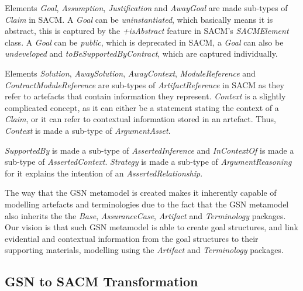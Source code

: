 Elements \textit{Goal}, \textit{Assumption}, \textit{Justification} and \textit{AwayGoal} are made sub-types of \textit{Claim} in SACM. A \textit{Goal} can be \textit{uninstantiated}, which basically means it is abstract, this is captured by the \textit{+isAbstract} feature in SACM's \textit{SACMElement} class. A \textit{Goal} can be \textit{public}, which is deprecated in SACM, a \textit{Goal} can also be \textit{undeveloped} and \textit{toBeSupportedByContract}, which are captured individually. 

Elements \textit{Solution}, \textit{AwaySolution}, \textit{AwayContext}, \textit{ModuleReference} and \textit{ContractModuleReference} are sub-types of \textit{ArtifactReference} in SACM as they refer to artefacts that contain information they represent. \textit{Context} is a slightly complicated concept, as it can either be a statement stating the context of a \textit{Claim}, or it can refer to contextual information stored in an artefact. Thus, \textit{Context} is made a sub-type of \textit{ArgumentAsset}. 

\textit{SupportedBy} is made a sub-type of \textit{AssertedInference} and \textit{InContextOf} is made a sub-type of \textit{AssertedContext}. \textit{Strategy} is made a sub-type of \textit{ArgumentReasoning} for it explains the intention of an \textit{AssertedRelationship}.

The way that the GSN metamodel is created makes it inherently capable of modelling artefacts and terminologies due to the fact that the GSN metamodel also inherits the the \textit{Base}, \textit{AssuranceCase}, \textit{Artifact} and \textit{Terminology} packages. Our vision is that such GSN metamodel is able to create goal structures, and link evidential and contextual information from the goal structures to their supporting materials, modelling using the \textit{Artifact} and \textit{Terminology} packages. 

\subsection{GSN to SACM Transformation}

